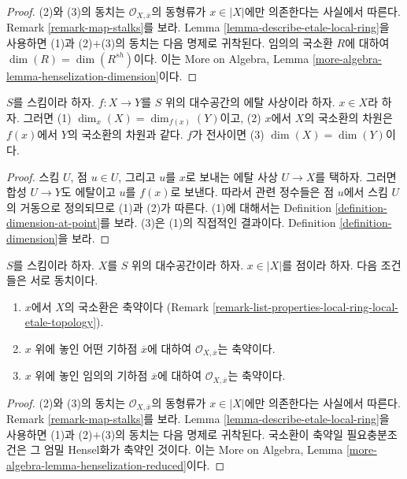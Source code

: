 \begin{proof}
(2)와 (3)의 동치는 $\mathcal{O}_{X, \overline{x}}$의 동형류가
$x \in |X|$에만 의존한다는 사실에서 따른다.
Remark \ref{remark-map-stalks}를 보라.
Lemma \ref{lemma-describe-etale-local-ring}을 사용하면
(1)과 (2)$+$(3)의 동치는 다음 명제로 귀착된다.
임의의 국소환 $R$에 대하여
$\dim(R) = \dim(R^{sh})$이다. 이는 More on Algebra, Lemma
\ref{more-algebra-lemma-henselization-dimension}이다.
\end{proof}

\begin{lemma}
\label{lemma-dimension-decent-invariant-under-etale}
$S$를 스킴이라 하자.
$f : X \to Y$를 $S$ 위의 대수공간의 에탈 사상이라 하자.
$x \in X$라 하자. 그러면 (1)
$\dim_x(X) = \dim_{f(x)}(Y)$이고, (2) $x$에서 $X$의 국소환의 차원은
$f(x)$에서 $Y$의 국소환의 차원과 같다.
$f$가 전사이면 (3) $\dim(X) = \dim(Y)$이다.
\end{lemma}

\begin{proof}
스킴 $U$, 점 $u \in U$, 그리고 $u$를 $x$로 보내는 에탈 사상
$U \to X$를 택하자. 그러면 합성 $U \to Y$도 에탈이고
$u$를 $f(x)$로 보낸다. 따라서 관련 정수들은 점 $u$에서
스킴 $U$의 거동으로 정의되므로 (1)과 (2)가 따른다.
(1)에 대해서는 Definition \ref{definition-dimension-at-point}를 보라.
(3)은 (1)의 직접적인 결과이다. Definition
\ref{definition-dimension}을 보라.
\end{proof}

\begin{lemma}
\label{lemma-reduced-local-ring}
$S$를 스킴이라 하자. $X$를 $S$ 위의 대수공간이라 하자.
$x \in |X|$를 점이라 하자. 다음 조건들은 서로 동치이다.
\begin{enumerate}
\item $x$에서 $X$의 국소환은 축약이다
(Remark \ref{remark-list-properties-local-ring-local-etale-topology}).
\item $x$ 위에 놓인 어떤 기하점 $\overline{x}$에 대하여
$\mathcal{O}_{X, \overline{x}}$는 축약이다.
\item $x$ 위에 놓인 임의의 기하점 $\overline{x}$에 대하여
$\mathcal{O}_{X, \overline{x}}$는 축약이다.
\end{enumerate}
\end{lemma}

\begin{proof}
(2)와 (3)의 동치는 $\mathcal{O}_{X, \overline{x}}$의 동형류가
$x \in |X|$에만 의존한다는 사실에서 따른다.
Remark \ref{remark-map-stalks}를 보라.
Lemma \ref{lemma-describe-etale-local-ring}을 사용하면
(1)과 (2)$+$(3)의 동치는 다음 명제로 귀착된다.
국소환이 축약일 필요충분조건은 그 엄밀 Hensel화가 축약인 것이다.
이는 More on Algebra, Lemma
\ref{more-algebra-lemma-henselization-reduced}이다.
\end{proof}











